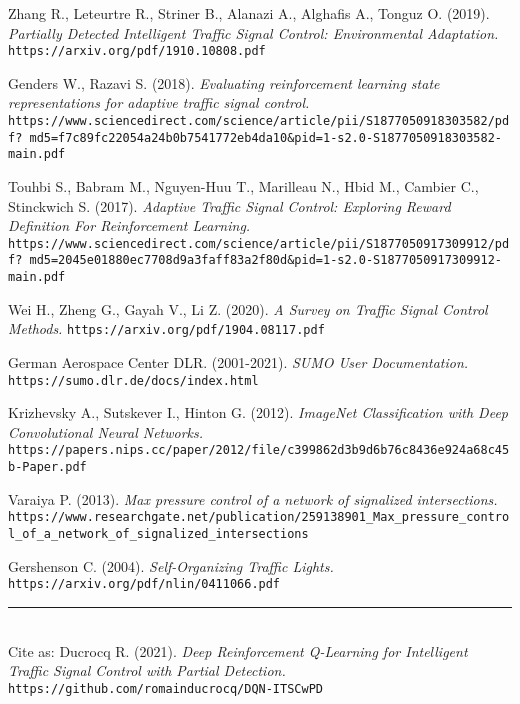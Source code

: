 \begin{thebibliography}{99}
Zhang R., Leteurtre R., Striner B., Alanazi A., Alghafis A., Tonguz O. (2019).
\textit{Partially Detected Intelligent Traffic Signal Control: Environmental Adaptation.}
\texttt{https://arxiv.org/pdf/1910.10808.pdf}

Genders W., Razavi S. (2018).
\textit{Evaluating reinforcement learning state representations for adaptive traffic signal control.}
\texttt{https://www.sciencedirect.com/science/article/pii/S1877050918303582/pdf? md5=f7c89fc22054a24b0b7541772eb4da10\&pid=1-s2.0-S1877050918303582-main.pdf}

Touhbi S., Babram M., Nguyen-Huu T., Marilleau N., Hbid M., Cambier C., Stinckwich S. (2017).
\textit{Adaptive Traffic Signal Control: Exploring Reward Definition For Reinforcement Learning.}
\texttt{https://www.sciencedirect.com/science/article/pii/S1877050917309912/pdf? md5=2045e01880ec7708d9a3faff83a2f80d\&pid=1-s2.0-S1877050917309912-main.pdf}

Wei H., Zheng G., Gayah V., Li Z. (2020).
\textit{A Survey on Traffic Signal Control Methods.}
\texttt{https://arxiv.org/pdf/1904.08117.pdf}

German Aerospace Center DLR. (2001-2021).
\textit{SUMO User Documentation.}
\texttt{https://sumo.dlr.de/docs/index.html}

Krizhevsky A., Sutskever I., Hinton G. (2012).
\textit{ImageNet Classification with Deep Convolutional Neural Networks.}
\texttt{https://papers.nips.cc/paper/2012/file/c399862d3b9d6b76c8436e924a68c45 b-Paper.pdf}

Varaiya P. (2013).
\textit{Max pressure control of a network of signalized intersections.}
\texttt{https://www.researchgate.net/publication/259138901\_Max\_pressure\_contro l\_of\_a\_network\_of\_signalized\_intersections}

Gershenson C. (2004).
\textit{Self-Organizing Traffic Lights.}
\texttt{https://arxiv.org/pdf/nlin/0411066.pdf}

\end{thebibliography}

\noindent\rule{\textwidth}{1pt}
\\

Cite as: Ducrocq R. (2021). 
\textit{Deep Reinforcement Q-Learning for Intelligent Traffic Signal Control with Partial Detection.}
\texttt{https://github.com/romainducrocq/DQN-ITSCwPD}